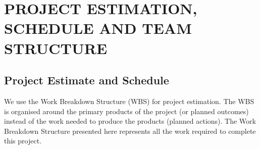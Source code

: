 \chapter{PROJECT ESTIMATION, SCHEDULE AND TEAM STRUCTURE}
\section{Project Estimate and Schedule}
We use the Work Breakdown Structure (WBS) for project estimation. The WBS is
organised around the primary products of the project (or planned outcomes) instead of
the work needed to produce the products (planned actions). The Work Breakdown
Structure presented here represents all the work required to complete this project. 


